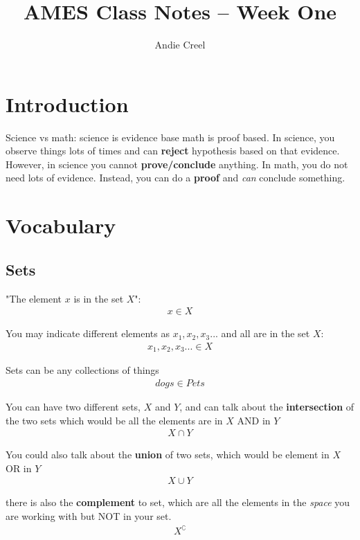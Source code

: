 \documentclass{article}
\title{AMES Class Notes -- Week One }
\author{Andie Creel}
\begin{document}
\maketitle

\section{Introduction}
Science vs math: science is evidence base math is proof based. In science, you observe things lots of times and can \textbf{reject} hypothesis based on that evidence. However, in science you cannot \textbf{prove/conclude} anything. In math, you do not need lots of evidence. Instead, you can do a \textbf{proof} and \textit{can} conclude something. 

\section{Vocabulary}

\subsection{Sets}
"The element $x$ is in the set $X$":
\begin{align*}
    x \in X
\end{align*}

You may indicate different elements as $x_1, x_2, x_3...$ and all are in the set $X$:
\begin{align*}
    x_1, x_2, x_3... \in X
\end{align*}

Sets can be any collections of things 
\begin{align*}
    dogs \in Pets
\end{align*}

You can have two different sets, $X$ and $Y$, and can talk about the \textbf{intersection} of the two sets which would be all the elements are in $X$ AND in $Y$ 
\begin{align*}
    X \cap Y
\end{align*}

You could also talk about the \textbf{union} of two sets, which would be element in $X$ OR in $Y$
\begin{align*}
    X \cup Y
\end{align*}

there is also the \textbf{complement} to set, which are all the elements in the \textit{space} you are working with but NOT in your set. 
\begin{align*}
    X^\complement
\end{align*}
\end{document}
